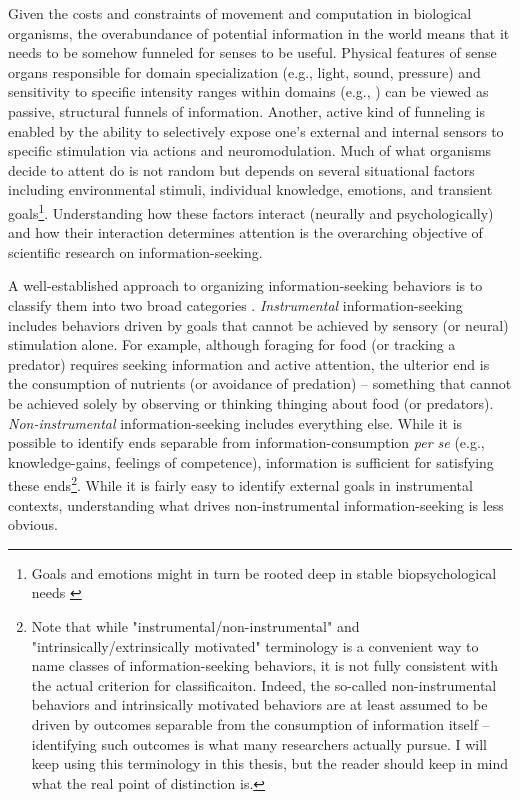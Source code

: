 Given the costs and constraints of movement and computation in biological organisms, the overabundance of potential information in the world means that it needs to be somehow funneled \cite{gottlieb_towards_2018} for senses to be useful. Physical features of sense organs responsible for domain specialization (e.g., light, sound, pressure) and sensitivity to specific intensity ranges within domains (e.g., \cite{schwab_evolution_2018}) can be viewed as passive, structural funnels of information. Another, active kind of funneling is enabled by the ability to selectively expose one's external and internal sensors to specific stimulation via actions and neuromodulation. Much of what organisms decide to attent do is not random but depends on several situational factors including environmental stimuli, individual knowledge, emotions, and transient goals\footnote{Goals and emotions might in turn be rooted deep in stable biopsychological needs \cite{ryan2017self}}. Understanding how these factors interact (neurally and psychologically) and how their interaction determines attention is the overarching objective of scientific research on information-seeking.

A well-established approach to organizing information-seeking behaviors is to classify them into two broad categories \cite{gottlieb_information-seeking_2013,gottlieb_towards_2018}. \emph{Instrumental} information-seeking includes behaviors driven by goals that cannot be achieved by sensory (or neural) stimulation alone. For example, although foraging for food (or tracking a predator) requires seeking information and active attention, the ulterior end is the consumption of nutrients (or avoidance of predation) -- something that cannot be achieved solely by observing or thinking thinging about food (or predators). \emph{Non-instrumental} information-seeking includes everything else. While it is possible to identify ends separable from information-consumption \emph{per se} (e.g., knowledge-gains, feelings of competence), information is sufficient for satisfying these ends\footnote{Note that while "instrumental/non-instrumental" and "intrinsically/extrinsically motivated" terminology is a convenient way to name classes of information-seeking behaviors, it is not fully consistent with the actual criterion for classificaiton. Indeed, the so-called non-instrumental behaviors and intrinsically motivated behaviors are at least assumed to be driven by outcomes separable from the consumption of information itself -- identifying such outcomes is what many researchers actually pursue. I will keep using this terminology in this thesis, but the reader should keep in mind what the real point of distinction is.}. While it is fairly easy to identify external goals in instrumental contexts, understanding what drives non-instrumental information-seeking is less obvious.

